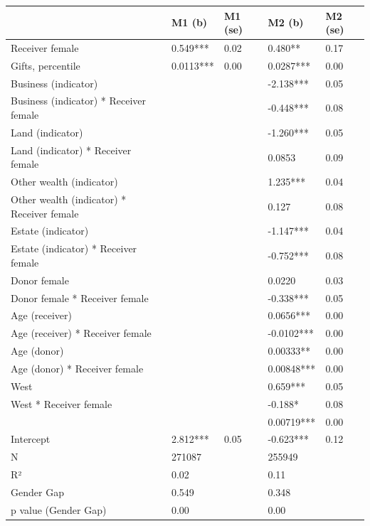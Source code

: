 \documentclass[
  letterpaper,
  DIV=11,
  numbers=noendperiod]{scrartcl}
\begin{document}
\begin{longtable}[]{@{}lllll@{}}
\toprule()
& M1 (b) & M1 (se) & M2 (b) & M2 (se) \\
\midrule()
\endhead
Receiver female & 0.549*** & 0.02 & 0.480** & 0.17 \\
Gifts, percentile & 0.0113*** & 0.00 & 0.0287*** & 0.00 \\
Business (indicator) & & & -2.138*** & 0.05 \\
Business (indicator) * Receiver female & & & -0.448*** & 0.08 \\
Land (indicator) & & & -1.260*** & 0.05 \\
Land (indicator) * Receiver female & & & 0.0853 & 0.09 \\
Other wealth (indicator) & & & 1.235*** & 0.04 \\
Other wealth (indicator) * Receiver female & & & 0.127 & 0.08 \\
Estate (indicator) & & & -1.147*** & 0.04 \\
Estate (indicator) * Receiver female & & & -0.752*** & 0.08 \\
Donor female & & & 0.0220 & 0.03 \\
Donor female * Receiver female & & & -0.338*** & 0.05 \\
Age (receiver) & & & 0.0656*** & 0.00 \\
Age (receiver) * Receiver female & & & -0.0102*** & 0.00 \\
Age (donor) & & & 0.00333** & 0.00 \\
Age (donor) * Receiver female & & & 0.00848*** & 0.00 \\
West & & & 0.659*** & 0.05 \\
West * Receiver female & & & -0.188* & 0.08 \\
& & & 0.00719*** & 0.00 \\
Intercept & 2.812*** & 0.05 & -0.623*** & 0.12 \\
N & 271087 & & 255949 & \\
R² & 0.02 & & 0.11 & \\
Gender Gap & 0.549 & & 0.348 & \\
p value (Gender Gap) & 0.00 & & 0.00 & \\
\bottomrule()
\end{longtable}
\end{document}
